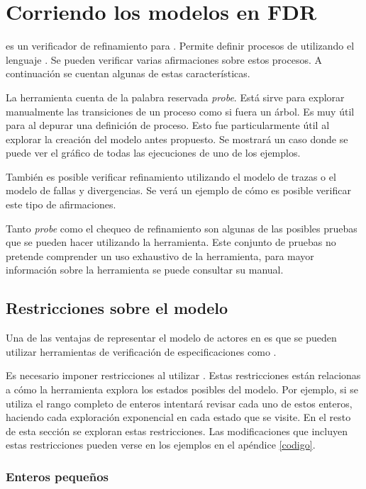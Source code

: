 \section{Corriendo los modelos en FDR}

\FDR es un verificador de refinamiento para \CSP. Permite definir procesos de \CSP utilizando el lenguaje \CSPm. Se pueden verificar varias afirmaciones sobre estos procesos. A continuación se cuentan algunas de estas características.

La herramienta cuenta de la palabra reservada \textit{probe}. Está sirve para explorar manualmente las transiciones de un proceso como si fuera un árbol. Es muy útil para al depurar una definición de proceso. Esto fue particularmente útil al explorar la creación del modelo antes propuesto. Se mostrará un caso donde se puede ver el gráfico de todas las ejecuciones de uno de los ejemplos. 
 
También es posible verificar refinamiento utilizando el modelo de trazas o el modelo de fallas y divergencias. Se verá un ejemplo de cómo es posible verificar este tipo de afirmaciones.

Tanto \textit{probe} como el chequeo de refinamiento son algunas de las posibles pruebas que se pueden hacer utilizando la herramienta. Este conjunto de pruebas no pretende comprender un uso exhaustivo de la herramienta, para mayor información sobre la herramienta se puede consultar su manual\cite{fdrmanual}.

\subsection{Restricciones sobre el modelo}
Una de las ventajas de representar el modelo de actores en \CSP es que se pueden utilizar herramientas de verificación de especificaciones \CSP como \FDR.

Es necesario imponer restricciones al utilizar \FDR. Estas restricciones están relacionas a cómo la herramienta explora los estados posibles del modelo. Por ejemplo, si se utiliza el rango completo de enteros intentará revisar cada uno de estos enteros, haciendo cada exploración exponencial en cada estado que se visite. En el resto de esta sección se exploran estas restricciones. Las modificaciones que incluyen estas restricciones pueden verse en los ejemplos en el apéndice \ref{codigo}.

\subsubsection*{Enteros pequeños}

